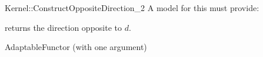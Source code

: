 \begin{ccRefFunctionObjectConcept}{Kernel::ConstructOppositeDirection_2}
A model for this must provide:


 {returns the direction opposite to $d$.}

\ccRefines
AdaptableFunctor (with one argument)

\ccSeeAlso
{} \\

\end{ccRefFunctionObjectConcept}
